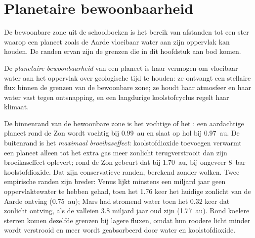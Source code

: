 \section{Planetaire bewoonbaarheid}\label{sec:b3:planetary-atmospheres:habitability}

De bewoonbare zone uit de schoolboeken is het bereik van afstanden tot een
ster waarop een planeet zoals de Aarde vloeibaar water aan zijn
oppervlak kan houden. De randen ervan zijn de grenzen die in dit hoofdstuk aan bod komen.

\begin{definition}\label{def:b3:planetary-atmospheres:habitability}
De \emph{planetaire bewoonbaarheid} van een
planeet is haar vermogen om vloeibaar water aan het oppervlak over
geologische tijd te houden: ze ontvangt een stellaire flux binnen de grenzen van de
bewoonbare zone; ze houdt haar atmosfeer en haar water vast tegen
ontsnapping, en een langdurige koolstofcyclus regelt haar klimaat.
\end{definition}

De binnenrand van de bewoonbare zone is het vochtige of het : een aardachtige planeet rond de Zon wordt vochtig bij
\qty{0.99}{au} en slaat op hol bij \qty{0.97}{au}. De buitenrand is het
\emph{maximaal broeikaseffect}: koolstofdioxide toevoegen verwarmt een planeet alleen tot
het extra gas meer zonlicht terugverstrooit dan zijn broeikaseffect
oplevert; rond de Zon gebeurt dat bij
\qty{1.70}{au}, bij ongeveer \qty{8}{bar} koolstofdioxide. Dat zijn
conservatieve randen, berekend zonder wolken. Twee empirische randen zijn breder:
Venus lijkt minstens een miljard jaar geen oppervlaktewater te hebben gehad,
toen het 1.76 keer het huidige zonlicht van de Aarde ontving (\qty{0.75}{au});
Mars had stromend water toen het 0.32 keer dat zonlicht ontving, als de
valleien 3.8 miljard jaar oud zijn (\qty{1.77}{au}). Rond koelere sterren komen dezelfde grenzen
bij lagere fluxen, omdat hun roodere licht minder wordt verstrooid en meer wordt
geabsorbeerd door water en koolstofdioxide.

